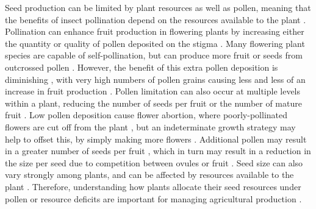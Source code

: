 \documentclass[12pt]{article} %
\begin{document}
Seed production can be limited by plant resources as well as pollen, meaning that the benefits of insect pollination depend on the resources available to the plant \citep{stephenson1981, marini2015, tamburini2017, tamburini2019}.
Pollination can enhance fruit production in flowering plants by increasing either the quantity or quality of pollen deposited on the stigma \citep{stephenson1981,burd1994,aizen2007}.
Many flowering plant species are capable of self-pollination, but can produce more fruit or seeds from outcrossed pollen \citep{knight2005}.
However, the benefit of this extra pollen deposition is diminishing \citep{plowright1981}, with very high numbers of pollen grains causing less and less of an increase in fruit production \citep{ashman2004, harder2016}.
Pollen limitation can also occur at multiple levels within a plant, reducing the number of seeds per fruit or the number of mature fruit \citep{burd1994}.
Low pollen deposition cause flower abortion, where poorly-pollinated flowers are cut off from the plant \citep{knight2006}, but an indeterminate growth strategy may help to offset this, by simply making more flowers \citep{doust1982,lawrence1993, sabbahi2006, bos2007}.
Additional pollen may result in a greater number of seeds per fruit \citep{knight2006}, which in turn may result in a reduction in the size per seed due to competition between ovules or fruit \citep{free1968, mazer1987}.
Seed size can also vary strongly among plants, and can be affected by resources available to the plant \citep{mazer1987, venable1992}. 
Therefore, understanding how plants allocate their seed resources under pollen or resource deficits are important for managing agricultural production \citep{bos2007, tamburini2019}.
\end{document}
